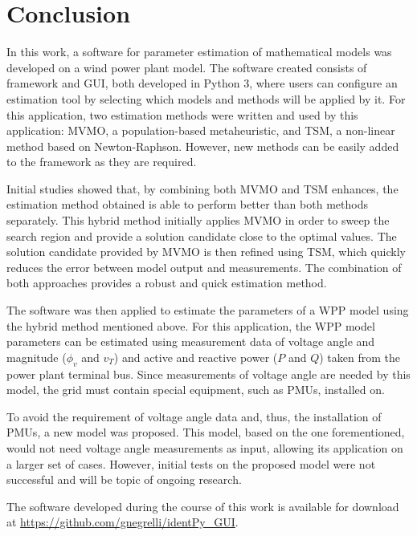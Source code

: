 \chapter{Conclusion}
\label{ch: Conclusion}

In this work, a software for parameter estimation of mathematical models was developed on a wind power plant model. The software created consists of framework and GUI, both developed in Python 3, where users can configure an estimation tool by selecting which models and methods will be applied by it. For this application, two estimation methods were written and used by this application: MVMO, a population-based metaheuristic, and TSM, a non-linear method based on Newton-Raphson. However, new methods can be easily added to the framework as they are required.

Initial studies showed that, by combining both MVMO and TSM enhances, the estimation method obtained is able to perform better than both methods separately. This hybrid method initially applies MVMO in order to sweep the search region and provide a solution candidate close to the optimal values. The solution candidate provided by MVMO is then refined using TSM, which quickly reduces the error between model output and measurements. The combination of both approaches provides a robust and quick estimation method.

The software was then applied to estimate the parameters of a WPP model using the hybrid method mentioned above. For this application, the WPP model parameters can be estimated using measurement data of voltage angle and magnitude ($\phi_{v}$ and $v_{T}$) and active and reactive power ($P$ and $Q$) taken from the power plant terminal bus. Since measurements of voltage angle are needed by this model, the grid must contain special equipment, such as PMUs, installed on.

To avoid the requirement of voltage angle data and, thus, the installation of PMUs, a new model was proposed. This model, based on the one forementioned, would not need voltage angle measurements as input, allowing its application on a larger set of cases. However, initial tests on the proposed model were not successful and will be topic of ongoing research.

The software developed during the course of this work is available for download at \href{https://github.com/gnegrelli/identPy\_GUI}{https://github.com/gnegrelli/identPy\_GUI}.